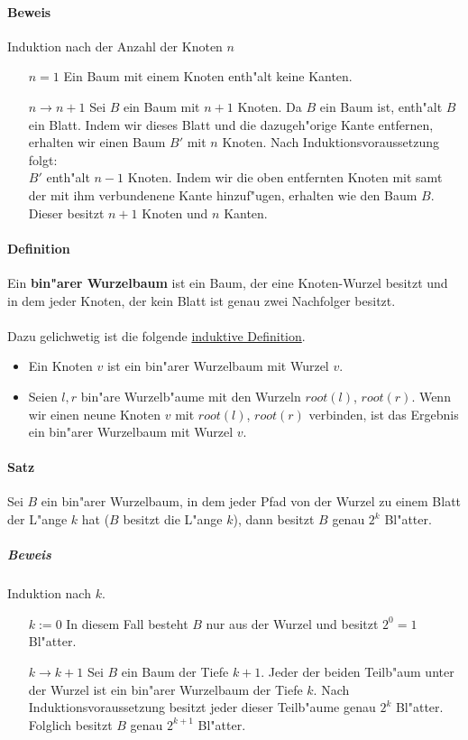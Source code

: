 \paragraph{Beweis} Induktion nach der Anzahl der Knoten $n$
\begin{itemize}
    \item[$n=1$] Ein Baum mit einem Knoten enth"alt keine Kanten.
    \item[$n\rightarrow n+1$] Sei $B$ ein Baum mit $n+1$ Knoten. Da $B$ ein Baum ist, enth"alt $B$ ein Blatt.
                              Indem wir dieses Blatt und die dazugeh"orige Kante entfernen, erhalten wir einen
                              Baum $B'$ mit $n$ Knoten. Nach Induktionsvoraussetzung folgt:\\
                              $B'$ enth"alt $n-1$ Knoten. Indem wir die oben entfernten Knoten mit samt der mit
                              ihm verbundenene Kante hinzuf"ugen, erhalten wie den Baum $B$. Dieser besitzt $n+1$
                              Knoten und $n$ Kanten.
\end{itemize}

\paragraph{Definition} \parskp
Ein \textbf{bin"arer Wurzelbaum} ist ein Baum, der eine Knoten-Wurzel besitzt und in dem jeder Knoten, der
kein Blatt ist genau zwei Nachfolger besitzt.\\
\\
Dazu gelichwetig ist die folgende \underline{induktive Definition}.
\begin{itemize}
    \item Ein Knoten $v$ ist ein bin"arer Wurzelbaum mit Wurzel $v$.
    \item Seien $l,r$ bin"are Wurzelb"aume mit den Wurzeln $root(l)$, $root(r)$. Wenn wir einen neune
          Knoten $v$ mit $root(l)$, $root(r)$ verbinden, ist das Ergebnis ein bin"arer Wurzelbaum mit
          Wurzel $v$.
\end{itemize}

\paragraph{Satz} \parskp
Sei $B$ ein bin"arer Wurzelbaum, in dem jeder Pfad von der Wurzel zu einem Blatt der L"ange $k$ hat
($B$ besitzt die L"ange $k$), dann besitzt $B$ genau $2^k$ Bl"atter.

\subparagraph{Beweis} Induktion nach $k$.
\begin{itemize}
    \item[$k:=0$] In diesem Fall besteht $B$ nur aus der Wurzel und besitzt $2^0=1$ Bl"atter.
    \item[$k\rightarrow k+1$] Sei $B$ ein Baum der Tiefe $k+1$. Jeder der beiden Teilb"aum unter der Wurzel
                            ist ein bin"arer Wurzelbaum der Tiefe $k$. Nach Induktionsvoraussetzung besitzt
                            jeder dieser Teilb"aume genau $2^k$ Bl"atter. Folglich besitzt $B$ genau
                            $2^{k+1}$ Bl"atter.
\end{itemize}


